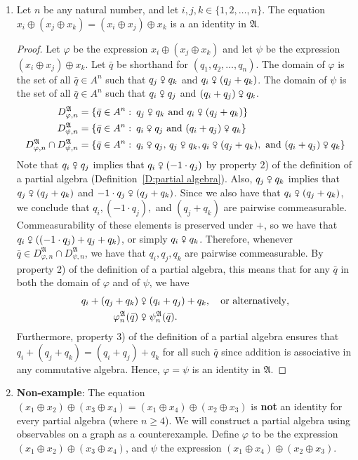 \documentclass{scrartcl}
\renewcommand{\phi}{\varphi}
\newcommand{\FA}{\mathfrak{A}}
\newcommand{\com}{\mathrel{\venus}}
\begin{document}
\begin{examples}
\begin{enumerate}[(1)]
\item
Let $n$ be any natural number, and let $i,j,k\in\{1,2,\ldots,n\}$. The equation $x_i\oplus(x_j\oplus x_k)=(x_i\oplus x_j)\oplus x_k$ is a an identity in $\FA$.
\begin{proof}
Let $\phi$ be the expression $x_i\oplus(x_j\oplus x_k)$ and let $\psi$ be the expression $(x_i\oplus x_j)\oplus x_k$. Let $\bar{q}$ be shorthand for $(q_1,q_2,\ldots,q_n)$. The domain of $\phi$ is the set of all $\bar{q}\in A^n$ such that $q_j\com q_k$ and $q_i\com(q_j+q_k)$. The domain of $\psi$ is the set of all $\bar{q}\in A^n$ such that $q_i\com q_j$ and $(q_i+q_j)\com q_k$.
\begin{align*}
D_{\phi,n}^{\FA}&=\{\bar{q}\in A^n\,\colon\,q_j\com q_k\text{ and } q_i\com(q_j+q_k)\}\\
D_{\psi,n}^{\FA}&=\{\bar{q}\in A^n\,\colon\,q_i\com q_j\text{ and }(q_i+q_j)\com q_k\}\\
D_{\phi,n}^{\FA}\cap D_{\psi,n}^{\FA}&=\left\{\bar{q}\in A^n\,\colon\,q_i\com q_j,\,q_j\com q_k,q_i\com(q_j+q_k),\text{ and }(q_i+q_j)\com q_k\right\}
\end{align*}
Note that $q_i\com q_j$ implies that $q_i\com(-1\cdot q_j)$ by property 2) of the definition of a partial algebra (Definition~\ref{D:partial algebra}). Also, $q_j\com q_k$ implies that $q_j\com(q_j+q_k)$ and $-1\cdot q_j\com(q_j+q_k)$. Since we also have that $q_i\com(q_j+q_k)$, we conclude that $q_i,(-1\cdot q_j),$ and $(q_j+q_k)$ are pairwise commeasurable. Commeasurability of these elements is preserved under $+$, so we have that $q_i\com((-1\cdot q_j)+q_j+q_k)$, or simply $q_i\com q_k$. Therefore, whenever $\bar{q}\in D_{\phi,n}^{\FA}\cap D_{\psi,n}^{\FA}$, we have that $q_i,q_j,q_k$ are pairwise commeasurable. By property 2) of the definition of a partial algebra, this means that for any $\bar{q}$ in both the domain of $\phi$ and of $\psi$, we have
\begin{align*}
q_i+(q_j+q_k)&\com(q_i+q_j)+q_k,\quad \text{or alternatively},\\
\phi_n^{\FA}(\bar{q})&\com\psi_n^{\FA}(\bar{q}).
\end{align*}
Furthermore, property 3) of the definition of a partial algebra ensures that $q_i+(q_j+q_k)=(q_i+q_j)+q_k$ for all such $\bar{q}$ since addition is associative in any commutative algebra. Hence, $\phi=\psi$ is an identity in $\FA$.
\end{proof}

\item
\textbf{Non-example}: The equation $(x_1\oplus x_2)\oplus(x_3\oplus x_4)=(x_1\oplus x_4)\oplus(x_2\oplus x_3)$ is \textbf{not} an identity for every partial algebra (where $n\geq4$). We will construct a partial algebra using observables on a graph as a counterexample. Define $\phi$ to be the expression $(x_1\oplus x_2)\oplus(x_3\oplus x_4)$, and $\psi$ the expression $(x_1\oplus x_4)\oplus(x_2\oplus x_3)$.


\end{enumerate}
\end{examples}
\end{document}

